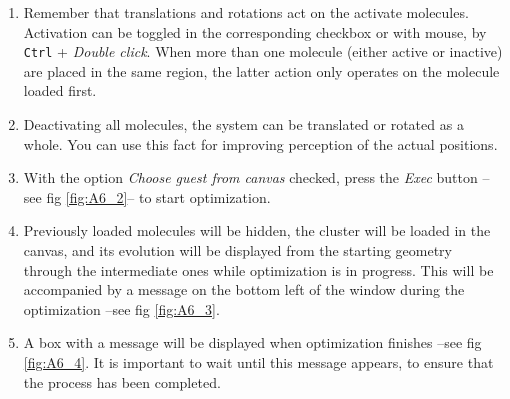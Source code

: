 \documentclass[10pt]{article}
\begin{document}
\begin{enumerate}
\item Remember that translations and rotations act on the activate molecules.
Activation can be toggled in the corresponding checkbox or with mouse, by
\texttt{Ctrl} + {\it Double click}.  When more than one molecule 
(either active or inactive) are placed in the same region, the latter action
only operates on the molecule loaded first.

\item Deactivating all molecules, the system can be translated or rotated as
a whole. You can use this fact for improving perception of the actual 
positions.

\item With the option {\it Choose guest from canvas} checked, press
the {\it Exec} button  --see fig \ref{fig:A6_2}-- to start optimization.

\item Previously loaded molecules will be hidden, the cluster 
will be loaded in the canvas, and its evolution will be
displayed from the starting geometry through the intermediate ones
while optimization is in progress. This will be accompanied by
a message on the bottom left of the window during the optimization
--see fig \ref{fig:A6_3}.

\item A box with a message will be displayed when optimization finishes
--see fig \ref{fig:A6_4}.
It is important to wait until this message appears, to ensure that
the process has been completed.


\end{enumerate}
\end{document}

